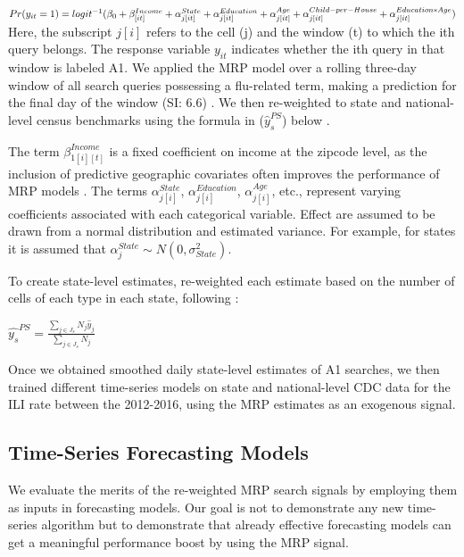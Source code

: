 \documentclass[fleqn,10pt]{wlscirep}
\begin{document}
$Pr(y_{it} = 1) = logit^{-1}( \beta_0  + \beta_{[it]}^{Income}
+ \alpha_{j[it]}^{State}
+ \alpha_{j[it]}^{Education}
+ \alpha_{j[it]}^{Age} \\
+ \alpha_{j[it]}^{Child-per-House}
+ \alpha_{j[it]}^{Education*Age} )$
\\

Here, the subscript $j[i]$ refers to the cell (j) and the window (t) to which the ith query belongs. The response variable $y_{it}$ indicates whether the ith query in that window is labeled A1. We applied the MRP model over a rolling three-day window of all search queries possessing a flu-related term, making a prediction for the final day of the window (SI: 6.6) \cite{bates_etal_2015}. We then re-weighted to state and national-level census benchmarks using the formula in ($\hat{y}_s^{PS}$) below \cite{wang2015forecasting}.

The term $\beta_{1[i][t]}^{Income}$ is a fixed coefficient on income at the zipcode level, as the inclusion of predictive geographic covariates often improves the performance of MRP models \cite{buttice_and_highton_2013}. The terms $\alpha_{j[i]}^{State}$,  $\alpha_{j[i]}^{Education}$,  $\alpha_{j[i]}^{Age}$, etc., represent varying coefficients associated with each categorical variable. Effect are assumed to be drawn from a normal distribution and estimated variance. For example, for states it is assumed that $\alpha_j^{State} \sim  N (0, \sigma_{State}^2)$.

To create state-level estimates, re-weighted each estimate based on the number of cells of each type in each state, following \cite{wang2015forecasting}:

$\hat{y_s}^{PS} =
\frac{ \sum_{ j \in J_s } N_j \hat{y}_j }{\sum_{ j \in J_s } N_j}$

Once we obtained smoothed daily state-level estimates of A1 searches, we then trained different time-series models on state and national-level CDC data for the ILI rate between the 2012-2016, using the MRP estimates as an exogenous signal.

\subsection*{Time-Series Forecasting Models}

We evaluate the merits of the re-weighted MRP search signals by employing them as inputs in forecasting models. Our goal is not to demonstrate any new time-series algorithm but to demonstrate that already effective forecasting models can get a meaningful performance boost by using the MRP signal.
\end{document}
